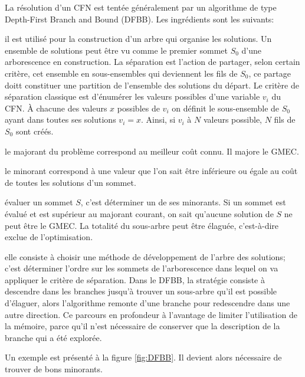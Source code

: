 La résolution d'un CFN est tentée généralement par un algorithme de type  \og Depth-First Branch and Bound \fg (DFBB). Les ingrédients sont les suivants:
\begin{description}[leftmargin=*] 
\item [Un principe de séparation:] il est utilisé pour la construction d'un arbre qui organise les solutions. Un ensemble de solutions peut être vu comme le premier sommet $S_0$ d'une arborescence en construction. La séparation est l'action de partager, selon certain critère, cet ensemble en sous-ensembles  qui deviennent les fils de $S_0$, ce partage doitt constituer une partition de l'ensemble des solutions du départ. Le critère de séparation classique est d'énumérer les valeurs possibles d'une variable $v_i$ du  CFN. À chacune des valeurs $x$ possibles de $v_i$ on définit le sous-ensemble de $S_0$ ayant dans toutes ses solutions $v_i=x$. Ainsi, si $v_i$ à $N$ valeurs possible, $N$ fils de $S_0$ sont créés.
\item [Un majorant:] le majorant du problème correspond au meilleur coût connu. Il majore le GMEC.
\item [Un minorant d'un sommet:] le minorant correspond à une valeur que l'on sait être inférieure ou égale au coût de toutes les solutions d'un sommet.  
\item [Un principe d'évaluation:] évaluer un sommet $S$, c'est déterminer un de ses minorants. Si un sommet est évalué et est supérieur au majorant courant, on sait qu'aucune solution de $S$ ne peut être le GMEC. La totalité du sous-arbre peut être élaguée, c'est-à-dire exclue de l'optimisation.  
\item [Une stratégie de développement:] elle consiste à choisir une méthode de développement de l'arbre des solutions; c'est déterminer l'ordre sur les sommets de l'arborescence dans lequel on va appliquer le critère de séparation. Dans le DFBB, la stratégie consiste à descendre dans les branches jusqu'à trouver un sous-arbre qu'il est possible d'élaguer, alors l'algorithme remonte d'une branche pour redescendre dans une autre direction. Ce parcours en profondeur à l'avantage de limiter l'utilisation de la mémoire, parce qu'il n'est nécessaire de conserver que la description de la branche qui a été explorée.
\end{description}  
Un exemple est présenté à la figure \ref{fig:DFBB}. Il devient alors nécessaire de trouver de bons minorants.
